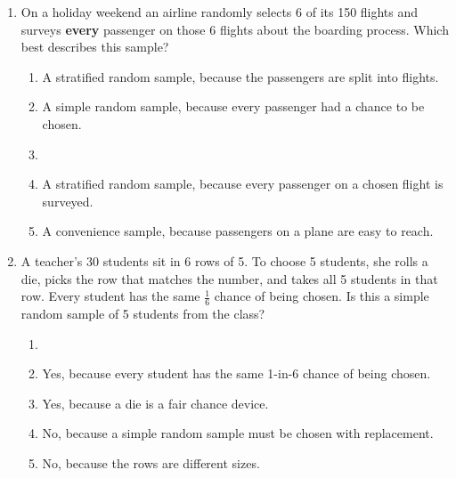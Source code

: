 \documentclass[12pt]{article}
\begin{document}
\begin{enumerate}[leftmargin=1.9em, itemsep=0.13in]
  \boxguard[12]
  \item On a holiday weekend an airline randomly selects 6 of its 150 flights and surveys
        \textbf{every} passenger on those 6 flights about the boarding process. Which best
        describes this sample?
        \begin{enumerate}[label=\textbf{(\Alph*)}, leftmargin=2.2em, itemsep=2pt]
          \item A stratified random sample, because the passengers are split into flights.
          \item A simple random sample, because every passenger had a chance to be chosen.
          \item {}
          \item A stratified random sample, because every passenger on a chosen flight is surveyed.
          \item A convenience sample, because passengers on a plane are easy to reach.\hfill{}\rule[-0.2in]{0pt}{0.48in}
        \end{enumerate}

  \boxguard[13]
  \item A teacher's 30 students sit in 6 rows of 5. To choose 5 students, she rolls a die,
        picks the row that matches the number, and takes all 5 students in that row. Every
        student has the same $\tfrac{1}{6}$ chance of being chosen. Is this a simple random
        sample of 5 students from the class?
        \begin{enumerate}[label=\textbf{(\Alph*)}, leftmargin=2.2em, itemsep=2pt]
          \item {}
          \item Yes, because every student has the same 1-in-6 chance of being chosen.
          \item Yes, because a die is a fair chance device.
          \item No, because a simple random sample must be chosen with replacement.
          \item No, because the rows are different sizes.\hfill{}\rule[-0.2in]{0pt}{0.48in}
        \end{enumerate}


\end{enumerate}
\end{document}
